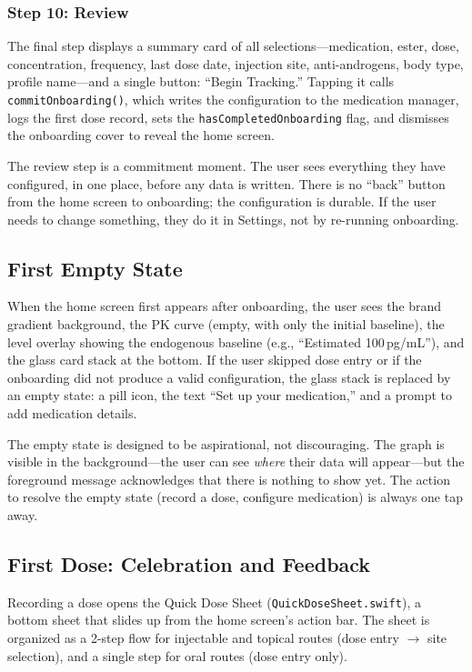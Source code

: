 \documentclass[11pt,a4paper]{article}
\newcommand{\code}[1]{\texttt{\small #1}}
\begin{document}
\subsubsection{Step 10: Review}

The final step displays a summary card of all selections---medication,
ester, dose, concentration, frequency, last dose date, injection site,
anti-androgens, body type, profile name---and a single button: ``Begin
Tracking.'' Tapping it calls \code{commitOnboarding()}, which writes the
configuration to the medication manager, logs the first dose record, sets
the \code{hasCompletedOnboarding} flag, and dismisses the onboarding
cover to reveal the home screen.

The review step is a commitment moment. The user sees everything they
have configured, in one place, before any data is written. There is no
``back'' button from the home screen to onboarding; the configuration is
durable. If the user needs to change something, they do it in Settings,
not by re-running onboarding.

\subsection{First Empty State}
\label{sec:empty_state}

When the home screen first appears after onboarding, the user sees the
brand gradient background, the PK curve (empty, with only the initial
baseline), the level overlay showing the endogenous baseline (e.g.,
``Estimated 100\,pg/mL''), and the glass card stack at the bottom. If
the user skipped dose entry or if the onboarding did not produce a valid
configuration, the glass stack is replaced by an empty state: a pill
icon, the text ``Set up your medication,'' and a prompt to add medication
details.

The empty state is designed to be aspirational, not discouraging. The
graph is visible in the background---the user can see \emph{where} their
data will appear---but the foreground message acknowledges that there is
nothing to show yet. The action to resolve the empty state (record a
dose, configure medication) is always one tap away.

\subsection{First Dose: Celebration and Feedback}
\label{sec:first_dose}

Recording a dose opens the Quick Dose Sheet (\code{QuickDoseSheet.swift}),
a bottom sheet that slides up from the home screen's action bar. The
sheet is organized as a 2-step flow for injectable and topical routes
(dose entry $\to$ site selection), and a single step for oral routes
(dose entry only).
\end{document}
